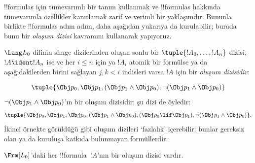 



!!{formula}s için tümevarımlı bir tanım kullanmak ve !!{formula}s hakkında
tümevarımla özellikler kanıtlamak zarif ve verimli bir yaklaşımdır. Bununla
birlikte !!{formula}s adım adım, daha aşağıdan yukarıya da kurulabilir;
burada bunu bir
\emph{oluşum dizisi} kavramını kullanarak yapıyoruz.

\begin{defn}
$\Lang L_0$ dilinin simge dizilerinden oluşan sonlu bir
$\tuple{!A_0,\dotsc,!A_n}$ dizisi, $!A \ident !A_n$ ise ve her $i \leq n$
için ya $!A_i$ atomik bir formülse ya da aşağıdakilerden birini sağlayan
$j,k < i$ indisleri varsa $!A$ için bir 
\emph{oluşum dizisidir}:
\begin{enumerate}
\end{enumerate}
\end{defn}

\begin{ex}
\[
\tuple{
    \Obj p_0,
    \Obj p_1,
    (\Obj p_1 \land \Obj p_0),
    \lnot (\Obj p_1 \land \Obj p_0)
}
\]
$\lnot (\Obj p_1 \land \Obj p_0)$'ın bir oluşum dizisidir; şu dizi de
öyledir:
\[
\tuple{
    \Obj p_0,
    \Obj p_1,
    \Obj p_0,
    (\Obj p_1 \land \Obj p_0),
    (\Obj p_0 \lif \Obj p_1),
    \lnot (\Obj p_1 \land \Obj p_0)
}.
\]
%
İkinci örnekte görüldüğü gibi oluşum dizileri `fazlalık' içerebilir: bunlar
gereksiz olan ya da kuruluşa katkıda bulunmayan formüllerdir.
\end{ex}

\begin{prop}
$\Frm[L_0]$'daki her !!{formula}~$!A$'nın bir oluşum dizisi vardır.
\end{prop}

